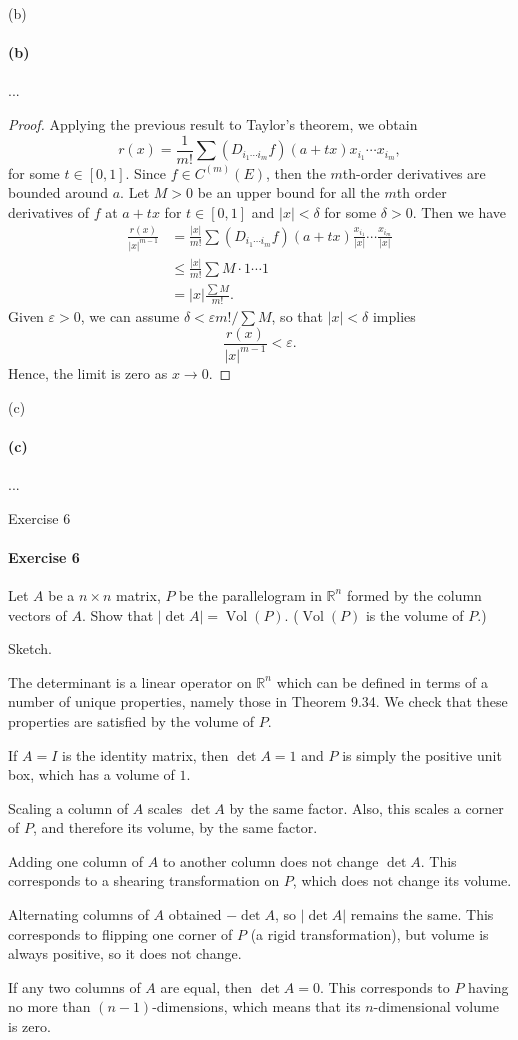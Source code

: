 \documentclass[12pt]{article}
\newenvironment{fullbox}{\begin{lrbox}{\savefullbox}\begin{minipage}{\dimexpr\textwidth-2\fboxsep\relax}}{\end{minipage}\end{lrbox}\begin{center}\framebox[\textwidth]{\usebox{\savefullbox}}\end{center}}
\newenvironment{pbox}[1][]{\begin{fullbox}\ifx#1\empty\else\paragraph{#1}\fi}{\end{fullbox}}
\theoremstyle{definition}
\newcommand{\R}{\mathbb{R}}
\newcommand{\eps}{\varepsilon}
\DeclareMathOperator{\Vol}{Vol}
\begin{document}
\begin{pbox}[(b)]
    ...
\end{pbox}

\begin{proof}
    Applying the previous result to Taylor's theorem, we obtain
    \[
        r(x) = \frac{1}{m!} \sum (D_{i_1 \cdots i_m}f)(a + tx) x_{i_1} \cdots x_{i_m},
    \]
    for some $t \in [0, 1]$. Since $f \in C^(m)(E)$, then the $m$th-order derivatives are bounded around $a$. Let $M > 0$ be an upper bound for all the $m$th order derivatives of $f$ at $a + tx$ for $t \in [0, 1]$ and $|x| < \delta$ for some $\delta > 0$. Then we have
    \begin{align*}
        \frac{r(x)}{|x|^{m - 1}}
            &= \frac{|x|}{m!} \sum (D_{i_1 \cdots i_m}f)(a + tx) \frac{x_{i_1}}{|x|} \cdots \frac{x_{i_m}}{|x|} \\
            &\leq \frac{|x|}{m!} \sum M \cdot 1\cdots 1 \\
            &= |x|\frac{\sum M}{m!}.
    \end{align*}
    Given $\eps > 0$, we can assume $\delta < \eps m!/\sum M$, so that $|x| < \delta$ implies
    \[
        \frac{r(x)}{|x|^{m - 1}} < \eps.
    \]
    Hence, the limit is zero as $x \to 0$.

\end{proof}


\begin{pbox}[(c)]
    ...
\end{pbox}

\newpage
\begin{pbox}[Exercise 6]
    Let $A$ be a $n \times n$ matrix, $P$ be the parallelogram in $\R^n$  formed by the column vectors of $A$. Show that $|\det A| = \Vol(P)$. ($\Vol(P)$ is the volume of $P$.)
\end{pbox}

Sketch.

The determinant is a linear operator on $\R^n$ which can be defined in terms of a number of unique properties, namely those in Theorem 9.34. We check that these properties are satisfied by the volume of $P$. 

If $A = I$ is the identity matrix, then $\det A = 1$ and $P$ is simply the positive unit box, which has a volume of $1$.

Scaling a column of $A$ scales $\det A$ by the same factor. Also, this scales a corner of $P$, and therefore its volume, by the same factor.

Adding one column of $A$ to another column does not change $\det A$. This corresponds to a shearing transformation on $P$, which does not change its volume.

Alternating columns of $A$ obtained  $-\det A$, so $|\det A|$ remains the same. This corresponds to flipping one corner of $P$ (a rigid transformation), but volume is always positive, so it does not change.

If any two columns of $A$ are equal, then $\det A = 0$. This corresponds to $P$ having no more than $(n- 1)$-dimensions, which means that its $n$-dimensional volume is zero.
\end{document}
